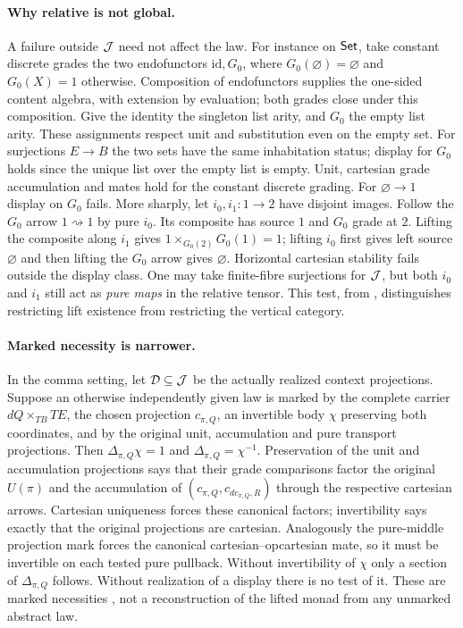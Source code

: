 \documentclass[11pt]{article}
\theoremstyle{definition}\newtheorem{definition}[theorem]{Definition}
\newcommand{\id}{\mathrm{id}}\newcommand{\op}{\mathrm{op}}\newcommand{\dom}{\mathrm{dom}}
\begin{document}
\paragraph{Why relative is not global.}
A failure outside $\mathcal J$ need not affect the law. For instance on
$\mathsf{Set}$, take constant discrete grades the two endofunctors
$\id,G_0$, where $G_0(\varnothing)=\varnothing$ and
$G_0(X)=1$ otherwise. Composition of endofunctors supplies the
one-sided content algebra, with extension by evaluation; both grades
close under this composition. Give the identity the singleton list
arity, and $G_0$ the empty list arity. These assignments respect
unit and substitution even on the empty set. For surjections
$E\to B$ the two sets have the same inhabitation status; display
for $G_0$ holds since the unique list over the empty list is empty.
Unit, cartesian grade accumulation and mates hold for the constant
discrete grading. For $\varnothing\to1$ display on $G_0$ fails.
More sharply, let $i_0,i_1:1\to2$ have disjoint images. Follow the
$G_0$ arrow $1\rightsquigarrow1$ by pure $i_0$. Its composite has
source $1$ and $G_0$ grade at $2$. Lifting the composite along
$i_1$ gives $1\times_{G_0(2)}G_0(1)=1$; lifting $i_0$ first gives
left source $\varnothing$ and then lifting the $G_0$ arrow gives
$\varnothing$. Horizontal cartesian stability fails outside the
display class. One may take finite-fibre surjections for $\mathcal J$, but
both $i_0$ and $i_1$ still act as \emph{pure maps} in the relative
tensor. This test, from \cite{C}, distinguishes restricting lift
existence from restricting the vertical category.

\paragraph{Marked necessity is narrower.}
In the comma setting, let $\mathcal D\subseteq\mathcal J$ be the actually
realized context projections. Suppose an otherwise independently
given law is marked by the complete carrier $dQ\times_{TB}TE$, the
chosen projection $c_{\pi,Q}$, an invertible body $\chi$ preserving
both coordinates, and by the original unit, accumulation and pure
transport projections. Then $\Delta_{\pi,Q}\chi=1$ and
$\Delta_{\pi,Q}=\chi^{-1}$. Preservation of the unit and
accumulation projections says that their grade comparisons factor
the original $U(\pi)$ and the accumulation of
$(c_{\pi,Q},c_{dc_{\pi,Q},R})$ through the respective cartesian
arrows. Cartesian uniqueness forces these canonical factors;
invertibility says exactly that the original projections are
cartesian. Analogously the pure-middle projection mark forces
the canonical cartesian--opcartesian mate, so it must be invertible
on each tested pure pullback. Without invertibility of $\chi$ only a
section of $\Delta_{\pi,Q}$ follows. Without realization of a
display there is no test of it. These are marked necessities
\cite[Sec.~6]{O1}, not a reconstruction of the lifted monad from
any unmarked abstract law.
\end{document}
